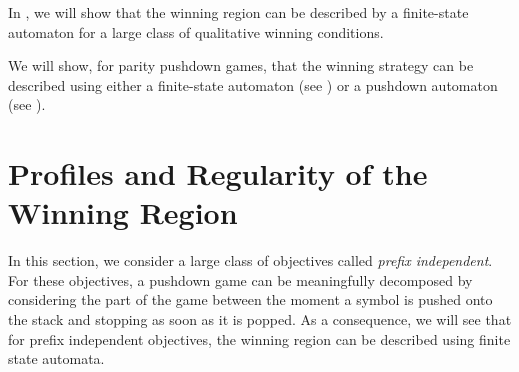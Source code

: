 In , we will show that the winning region can be described by a finite-state automaton  for a large class of qualitative winning conditions.



We will show, for parity pushdown games, that the winning strategy can be described using either a finite-state automaton (see ) or a pushdown automaton (see ).


\section{Profiles and Regularity of the Winning Region}

In this section, we consider a large class of objectives called \emph{prefix independent}. For these objectives, a pushdown game can be meaningfully decomposed by considering the part of the game between the moment a symbol is pushed onto the stack and stopping as soon as it is popped.  As a consequence, we will see that for prefix independent
objectives, the winning region can be described  using finite state automata.





